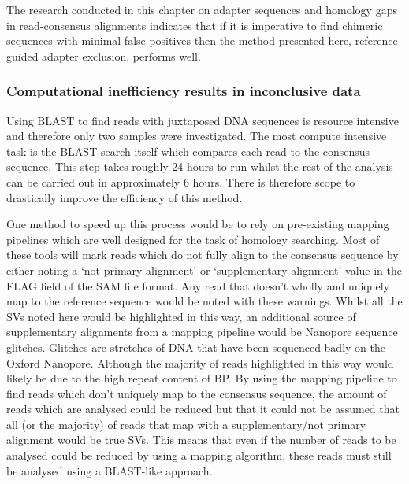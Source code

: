 \documentclass{article}
\begin{document}
 
The research conducted in this chapter on adapter sequences and homology gaps in read-consensus alignments indicates that if it is imperative to find chimeric sequences with minimal false positives then the method presented here, reference guided adapter exclusion, performs well.
 
\subsubsection{Computational inefficiency results in inconclusive data}

Using BLAST to find reads with juxtaposed DNA sequences is resource intensive and therefore only two samples were investigated. The most compute intensive task is the  BLAST search itself which compares each read to the consensus sequence. This step takes roughly 24 hours to run whilst the rest of the analysis can be carried out in approximately 6 hours. There is therefore scope to drastically improve the efficiency of this method.

One method to speed up this process would be to rely on pre-existing mapping pipelines which are well designed for the task of homology searching. Most of these tools  will mark reads which do not fully align to the consensus sequence by either noting a `not primary alignment' or `supplementary alignment' value in the FLAG field of the SAM file format. Any read that doesn't wholly and uniquely map to the reference sequence would be noted with these warnings.  Whilst all the SVs noted here would be highlighted in this way, an additional source of supplementary alignments from a mapping pipeline would be Nanopore sequence glitches. Glitches are stretches of DNA that have been sequenced badly on the Oxford Nanopore. Although the majority of reads highlighted in this way would likely be due to the high repeat content of BP. By using the mapping pipeline to find reads which don't uniquely map to the consensus sequence,  the amount of reads which are analysed could be reduced but that  it could not be assumed that all (or the majority) of reads that map with a supplementary/not primary alignment would be true SVs. This means that even if the number of reads to be analysed could be reduced by using a mapping algorithm, these reads must still be analysed using a BLAST-like approach.

\end{document}
